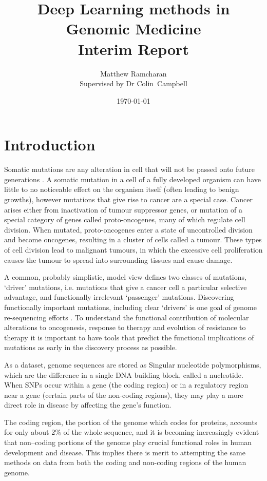 \documentclass[11pt]{article}
\title{Deep Learning methods in Genomic Medicine\\ Interim Report}
\author{Matthew Ramcharan \\ Supervised by Dr Colin\ Campbell}
\date{\today}
\begin{document}
\maketitle

\section{Introduction}

Somatic mutations are any alteration in cell that will not be passed onto future generations \cite{Griffiths2000}. A somatic mutation in a cell of a fully developed organism can have little to no noticeable effect on the organism itself (often leading to benign growths), however mutations that give rise to cancer are a special case. Cancer arises either from inactivation of tumour suppressor genes, or mutation of a special category of genes called proto-oncogenes, many of which regulate cell division. When mutated, proto-oncogenes enter a state of uncontrolled division and become oncogenes, resulting in a cluster of cells called a tumour.  
These types of cell division lead to malignant tumours, in which the excessive cell proliferation causes the tumour to spread into surrounding tissues and cause damage. 

A common, probably simplistic, model view defines two classes of mutations, `driver' mutations, i.e. mutations that give a cancer cell a particular selective advantage, and functionally irrelevant `passenger' mutations.
Discovering functionally important mutations, including clear ‘drivers’ is one goal of genome re-sequencing efforts \cite{Reva2011}. To understand the functional contribution of molecular alterations to oncogenesis, response to therapy and evolution of resistance to therapy it is important to have tools that predict the functional implications of mutations as early in the discovery process as possible.

As a dataset, genome sequences are stored as Singular nucleotide polymorphisms, which are the difference in a single DNA building block, called a nucleotide. When SNPs occur within a gene (the coding region) or in a regulatory region near a gene (certain parts of the non-coding regions), they may play a more direct role in disease by affecting the gene’s function.

The coding region, the portion of the genome which codes for proteins, accounts for only about 2\% of the whole sequence, and it is becoming increasingly evident that non–coding portions of the genome play crucial functional roles in human development and disease\cite{Esteller2011}. This implies there is merit to attempting the same methods on data from both the coding and non-coding regions of the human genome.
\end{document}
